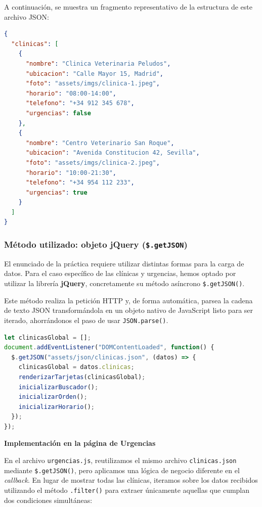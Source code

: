 \documentclass[11pt]{article}
\begin{document}
A continuación, se muestra un fragmento representativo de la estructura de este archivo JSON:

\begin{lstlisting}[language=json, caption=Estructura simplificada del archivo clinicas.json]
{
  "clinicas": [
    {
      "nombre": "Clinica Veterinaria Peludos",
      "ubicacion": "Calle Mayor 15, Madrid",
      "foto": "assets/imgs/clinica-1.jpeg",
      "horario": "08:00-14:00",
      "telefono": "+34 912 345 678",
      "urgencias": false
    },
    {
      "nombre": "Centro Veterinario San Roque",
      "ubicacion": "Avenida Constitucion 42, Sevilla",
      "foto": "assets/imgs/clinica-2.jpeg",
      "horario": "10:00-21:30",
      "telefono": "+34 954 112 233",
      "urgencias": true
    }
  ]
}
\end{lstlisting}

\subsubsection{Método utilizado: objeto jQuery (\texttt{\$.getJSON})}

El enunciado de la práctica requiere utilizar distintas formas para la carga de datos. Para el caso específico de las clínicas y urgencias, hemos optado por utilizar la librería \textbf{jQuery}, concretamente su método asíncrono \texttt{\$.getJSON()}.

Este método realiza la petición HTTP y, de forma automática, parsea la cadena de texto JSON transformándola en un objeto nativo de JavaScript listo para ser iterado, ahorrándonos el paso de usar \texttt{JSON.parse()}.

\begin{lstlisting}[language=JavaScript, caption=Carga asíncrona de JSON mediante jQuery en clinicas.js]
let clinicasGlobal = [];
document.addEventListener("DOMContentLoaded", function() {
  $.getJSON("assets/json/clinicas.json", (datos) => {
    clinicasGlobal = datos.clinicas;
    renderizarTarjetas(clinicasGlobal);
    inicializarBuscador();
    inicializarOrden();
    inicializarHorario();
  });
});
\end{lstlisting}

\textbf{Implementación en la página de Urgencias}

En el archivo \texttt{urgencias.js}, reutilizamos el mismo archivo \texttt{clinicas.json} mediante \texttt{\$.getJSON()}, pero aplicamos una lógica de negocio diferente en el \textit{callback}. En lugar de mostrar todas las clínicas, iteramos sobre los datos recibidos utilizando el método \texttt{.filter()} para extraer únicamente aquellas que cumplan dos condiciones simultáneas:
\end{document}
